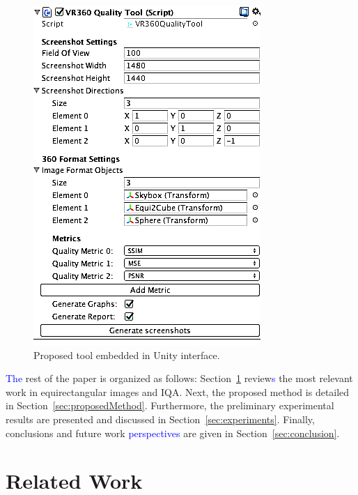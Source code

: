 \documentclass[10pt,conference]{IEEEtran}
\begin{document}
\begin{figure}[h!]
    \centering
    \includegraphics[width=0.73\linewidth]{figs/tool_edit.png}%
    \caption{Proposed tool embedded in Unity interface.}
    \label{fig:tool}
\end{figure}


\textcolor{blue}{The} rest of the paper is organized as follows: Section~\ref{sec:related_work} review\textcolor{blue}{s} the most relevant work in equirectangular images and IQA. Next, the proposed method is detailed in Section~\ref{sec:proposedMethod}. Furthermore, the preliminary experimental results are presented and discussed in Section~\ref{sec:experiments}. Finally, conclusions and future work \textcolor{blue}{perspectives} are given in Section~\ref{sec:conclusion}.

\section{Related Work}\label{sec:related_work}
\end{document}
